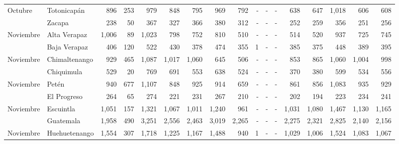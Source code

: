 \begin{landscape}
\begin{center}
\begin{longtable}{llrrrrrrrrrrrrrrr}
\multicolumn{1}{l}{	\footnotesize	 Octubre 	}&	 Totonicapán 	&	 896 	&	 253 	&	 979 	&	 848 	&	 795 	&	 969 	&	 792 	&	 -   	&	 -   	&	 -   	&	 638 	&	 647 	&	 1,018 	&	 606 	&	 608 	\\
\rowcolor{color1!5!white}\multicolumn{1}{l}{	\footnotesize	 Octubre 	}&	 Zacapa 	&	 238 	&	 50 	&	 367 	&	 327 	&	 366 	&	 380 	&	 312 	&	 -   	&	 -   	&	 -   	&	 252 	&	 259 	&	 356 	&	 251 	&	 256 	\\
\multicolumn{1}{l}{	\footnotesize	 Noviembre 	}&	 Alta Verapaz 	&	 1,006 	&	 89 	&	 1,023 	&	 798 	&	 752 	&	 810 	&	 510 	&	 -   	&	 -   	&	 -   	&	 514 	&	 520 	&	 937 	&	 725 	&	 745 	\\
\rowcolor{color1!5!white}\multicolumn{1}{l}{	\footnotesize	 Noviembre 	}&	 Baja Verapaz 	&	 406 	&	 120 	&	 522 	&	 430 	&	 378 	&	 474 	&	 355 	&	 1 	&	 -   	&	 -   	&	 385 	&	 375 	&	 448 	&	 389 	&	 395 	\\
\multicolumn{1}{l}{	\footnotesize	 Noviembre 	}&	 Chimaltenango 	&	 929 	&	 465 	&	 1,087 	&	 1,017 	&	 1,060 	&	 645 	&	 506 	&	 -   	&	 -   	&	 -   	&	 853 	&	 865 	&	 1,060 	&	 1,004 	&	 998 	\\
\rowcolor{color1!5!white}\multicolumn{1}{l}{	\footnotesize	 Noviembre 	}&	 Chiquimula 	&	 529 	&	 20 	&	 769 	&	 691 	&	 553 	&	 638 	&	 524 	&	 -   	&	 -   	&	 -   	&	 370 	&	 380 	&	 599 	&	 534 	&	 556 	\\
\multicolumn{1}{l}{	\footnotesize	 Noviembre 	}&	 Petén 	&	 940 	&	 677 	&	 1,107 	&	 848 	&	 925 	&	 914 	&	 659 	&	 -   	&	 -   	&	 -   	&	 861 	&	 856 	&	 1,083 	&	 935 	&	 929 	\\
\rowcolor{color1!5!white}\multicolumn{1}{l}{	\footnotesize	 Noviembre 	}&	 El Progreso 	&	 264 	&	 65 	&	 274 	&	 221 	&	 231 	&	 267 	&	 210 	&	 -   	&	 -   	&	 -   	&	 202 	&	 194 	&	 223 	&	 234 	&	 241 	\\
\multicolumn{1}{l}{	\footnotesize	 Noviembre 	}&	 Escuintla 	&	 1,051 	&	 157 	&	 1,321 	&	 1,067 	&	 1,011 	&	 1,240 	&	 961 	&	 -   	&	 -   	&	 -   	&	 1,031 	&	 1,080 	&	 1,467 	&	 1,130 	&	 1,165 	\\
\rowcolor{color1!5!white}\multicolumn{1}{l}{	\footnotesize	 Noviembre 	}&	 Guatemala 	&	 1,958 	&	 490 	&	 3,251 	&	 2,556 	&	 2,463 	&	 3,019 	&	 2,265 	&	 -   	&	 -   	&	 -   	&	 2,275 	&	 2,321 	&	 2,825 	&	 2,140 	&	 2,156 	\\
\multicolumn{1}{l}{	\footnotesize	 Noviembre 	}&	 Huehuetenango 	&	 1,554 	&	 307 	&	 1,718 	&	 1,225 	&	 1,167 	&	 1,488 	&	 940 	&	 1 	&	 -   	&	 -   	&	 1,029 	&	 1,006 	&	 1,524 	&	 1,083 	&	 1,067 	\\

\end{longtable}
\end{center}
\end{landscape}
